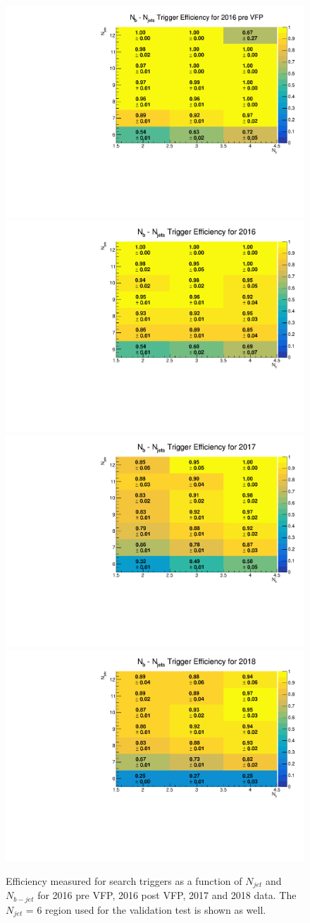 \documentclass[twoside]{article}
\begin{document}
\begin{figure}[!t]
    \centering
    \includegraphics[width=.4\columnwidth]{plots/Trigger/2016_preVFP.pdf}
    \includegraphics[width=.4\columnwidth]{plots/Trigger/2016.pdf}
    \includegraphics[width=.4\columnwidth]{plots/Trigger/2017.pdf}
    \includegraphics[width=.4\columnwidth]{plots/Trigger/2018.pdf}
    
    \caption{Efficiency measured for search triggers as a function of $N_{jet}$ and $N_{b-jet}$ for 2016 pre VFP, 2016 post VFP, 2017 and 2018 data. The $N_{jet}$ = 6 region used for the validation test is shown as well.}
    \label{figure_1} 
\end{figure}
\end{document}
